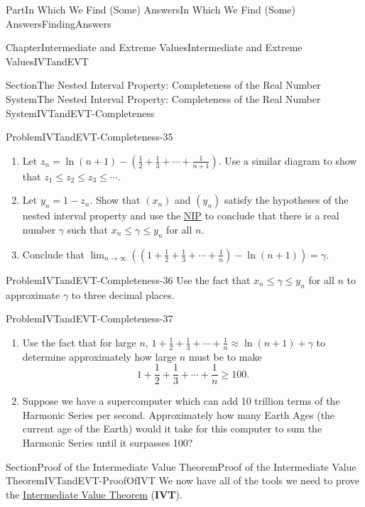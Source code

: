 \documentclass[oneside,10pt,]{book}
\newcommand{\terminology}[1]{\textbf{#1}}
\numberwithin{equation}{part}
\begin{document}
\begin{partptx}{Part}{In Which We Find (Some) Answers}{}{In Which We Find (Some) Answers}{}{}{FindingAnswers}
\begin{chapterptx}{Chapter}{Intermediate and Extreme Values}{}{Intermediate and Extreme Values}{}{}{IVTandEVT}
\begin{sectionptx}{Section}{The Nested Interval Property: Completeness of the Real Number System}{}{The Nested Interval Property: Completeness of the Real Number System}{}{}{IVTandEVT-Completeness}
\begin{problem}{Problem}{}{IVTandEVT-Completeness-35}
\begin{enumerate}[font=\bfseries,label=(\alph*),ref=\alph*]
\item{}Let \(z_n=\ln\left(n+1\right)-\left(\frac{1}{2}+\frac{1}{3}+\cdots+\frac{1}{n+1}
\right)\).  Use a similar diagram to show that \(z_1\leq z_2\leq z_3\leq\cdots\).%
\item{}Let \(y_n=1-z_n\).  Show that \(\left(x_n\right)\) and \(\left(y_n\right)\) satisfy the hypotheses of the nested interval property and use the \hyperref[NIP]{NIP}  to conclude that there is a real number \(\gamma\) such that \(x_n\leq\gamma\leq y_n\) for all \(n\).%
\item{}Conclude that \(\lim_{n\rightarrow\infty}\left(\left(1+\frac{1}{2}+\frac{1}{3}+\cdots+
\frac{1}{n}\right)-\ln\left(n+1\right)\right)=\gamma\).%
\end{enumerate}%
\end{problem}
\begin{problem}{Problem}{}{IVTandEVT-Completeness-36}%
Use the fact that \(x_n\leq\gamma\leq y_n\) for all \(n\) to approximate \(\gamma\) to three decimal places.%
\end{problem}
\begin{problem}{Problem}{}{IVTandEVT-Completeness-37}%
\begin{enumerate}[font=\bfseries,label=(\alph*),ref=\alph*]%
\item{}Use the fact that for large \(n\), \(1+\frac{1}{2}+\frac{1}{3}+\cdots+\frac{1}{n}\approx
\ln\left(n+1\right)+ \gamma\) to determine approximately how large \(n\) must be to make%
\begin{equation*}
1+\frac{1}{2}+\frac{1}{3}+\cdots+\frac{1}{n}\geq 100\text{.}
\end{equation*}
%
\item{}Suppose we have a supercomputer which can add 10 trillion terms of the Harmonic Series per second.  Approximately how many Earth Ages (the current age of the Earth) would it take for this computer to sum the Harmonic Series until it surpasses 100?%
\end{enumerate}%
\end{problem}
\end{sectionptx}
%
%
\typeout{************************************************}
\typeout{************************************************}
%
\begin{sectionptx}{Section}{Proof of the Intermediate Value Theorem}{}{Proof of the Intermediate Value Theorem}{}{}{IVTandEVT-ProofOfIVT}
We now have all of the tools we need to prove the \hyperref[IntermediateValueTheorem]{Intermediate Value Theorem} (\terminology{IVT}).%

\end{sectionptx}
\end{chapterptx}
\end{partptx}
\end{document}
